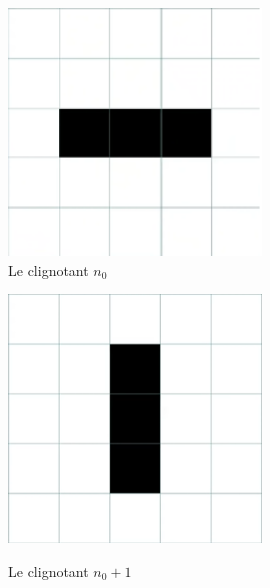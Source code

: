 \documentclass[12,french]{report}
\begin{document}
\begin{figure}[H]
    \begin{minipage}[c]{.46\linewidth}
        \centering
        \includegraphics[width=0.6\textwidth]{./Images/10}\\
        \caption{Le clignotant $n_{0}$}
    \end{minipage}
    \hfill%
    \begin{minipage}[c]{.46\linewidth}
        \centering
        \includegraphics[width=0.6\textwidth]{./Images/10'}\\
        \caption{Le clignotant $n_{0}+1$}
    \end{minipage}
\end{figure}\vspace{0.25cm}
\end{document}

